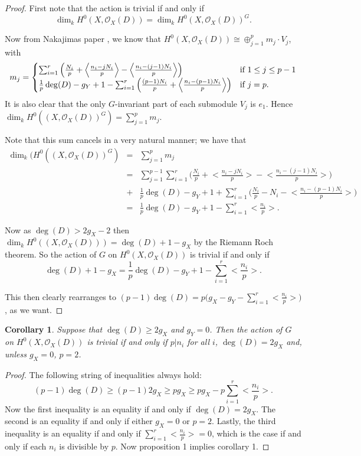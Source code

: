 \documentclass[11pt]{article} %
\newtheorem{cor}{Corollary}
\begin{document}
\begin{proof}
First note that the action is trivial if and only if \[ \dim_kH^0(X,\mathscr{O}_X(D))=\dim_kH^0(X,\mathscr{O}_X(D))^G.\]

Now from Nakajimas paper \citep{naka}, we know that $H^0(X,\mathscr{O}_X(D))\cong \oplus _{j=1}^p m_j\cdot V_j$, with 
	\begin{equation*}
		m_j=
			\begin{cases}
				\sum_{i=1}^r\Big(\frac{N_i}{p}+\Big{<}\frac{n_i-jN_i}													{p}\Big{>}-\Big{<}\frac{n_i-(j-1)N_i}{p}\Big{>}\Big) & \mbox{if }1\leq j\leq p-1 \\
				\frac{1}{p}\deg(D)-g_Y+1-\sum_{i=1}^r\Big(\frac{(p-1)N_i}{p}+\Big<\frac{n_i-(p-1)N_i}					{p}\Big>\Big) & \mbox{if }j=p.
			\end{cases}
	\end{equation*}
It is also clear that the only $G$-invariant part of each submodule $V_j$ is $e_1$. Hence $\dim_kH^0((X,\mathscr{O}_X(D))^G) = \sum_{j=1}^p m_j$.

Note that this sum cancels in a very natural manner; we have that
	\begin{eqnarray*}
		\dim_k(H^0((X,\mathscr{O}_X(D))^G) & = & \sum_{j=1}^p m_j \\
		& = & \sum_{j=1}^{p-1}  \sum_{i=1}^r\Big(\frac{N_i}{p}+\Big<\frac{n_i-jN_i}							{p}\Big>-\Big<\frac{n_i-(j-1)N_i}{p}\Big>\Big) \\
		& + & \frac{1}{p}\deg(D)-g_Y+1+\sum_{i=1}^r\Big(\frac{N_i}{p}-N_i-\Big<\frac{n_i-(p-1)N_i}				{p}\Big>\Big) \\
		& = & \frac{1}{p}\deg(D)-g_Y+1-\sum_{i=1}^r \Big<\frac{n_i}{p}\Big>.
	\end{eqnarray*}

Now as $\deg(D)>2g_X-2$ then $\dim_kH^0((X,\mathscr{O}_X(D))) =\deg(D)+1-g_X$ by the Riemann Roch theorem. So the action of $G$ on $H^0(X,\mathscr{O}_X(D))$ is trivial if and only if
	\begin{equation*}
		\deg(D)+1-g_X  = \frac{1}{p}\deg(D)-g_Y+1-\sum_{i=1}^r\Big<\frac{n_i}{p}\Big>. \label{hi}
	\end{equation*}

This then clearly rearranges to $(p-1)\deg(D)=p\Big(g_X-g_Y-\sum_{i=1}^r\Big<\frac{n_i}{p}\Big>\Big)$, as we want.
\end{proof}

\begin{cor}
Suppose that $\deg(D)\geq 2g_X$ and $g_Y=0$. Then the action of $G$ on $H^0(X,\mathscr{O}_X(D))$ is trivial if and only if $p | n_i$ for all $i$, $\deg(D)=2g_X$ and, unless $g_X=0$, $p=2$.
\end{cor}
\begin{proof}
The following string of inequalities always hold:
	\[
		(p-1)\deg(D)\geq (p-1)2g_X \geq pg_X \geq pg_X-p\sum_{i=1}^r\Big<\frac{n_i}{p}\Big>.
	\]
Now the first inequality is an equality if and only if $\deg(D)=2g_X$. The second is an equality if and only if either $g_X=0$ or $p=2$. Lastly, the third inequality is an equality if and only if $\sum_{i=1}^r\Big<\frac{n_i}{p}\Big>=0$, which is the case if and only if each $n_i$ is divisible by $p$. Now proposition 1 implies corollary 1.
\end{proof}
\end{document}
